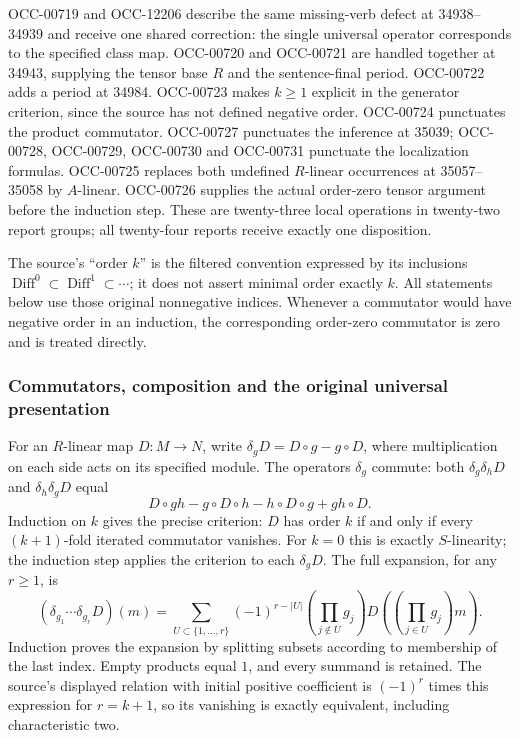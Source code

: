 OCC-00719 and OCC-12206 describe the same missing-verb defect at 34938--34939 and receive one shared correction: the single universal operator corresponds to the specified class map. OCC-00720 and OCC-00721 are handled together at 34943, supplying the tensor base \(R\) and the sentence-final period. OCC-00722 adds a period at 34984. OCC-00723 makes \(k\ge1\) explicit in the generator criterion, since the source has not defined negative order. OCC-00724 punctuates the product commutator. OCC-00727 punctuates the inference at 35039; OCC-00728, OCC-00729, OCC-00730 and OCC-00731 punctuate the localization formulas. OCC-00725 replaces both undefined \(R\)-linear occurrences at 35057--35058 by \(A\)-linear. OCC-00726 supplies the actual order-zero tensor argument before the induction step. These are twenty-three local operations in twenty-two report groups; all twenty-four reports receive exactly one disposition.

The source's ``order \(k\)'' is the filtered convention expressed by its inclusions \(\operatorname{Diff}^0\subset\operatorname{Diff}^1\subset\cdots\); it does not assert minimal order exactly \(k\). All statements below use those original nonnegative indices. Whenever a commutator would have negative order in an induction, the corresponding order-zero commutator is zero and is treated directly.

\subsubsection{Commutators, composition and the original universal presentation}\label{commutators-composition-and-the-original-universal-presentation}

For an \(R\)-linear map \(D:M\to N\), write \(\delta_gD=D\circ g-g\circ D\), where multiplication on each side acts on its specified module. The operators \(\delta_g\) commute: both \(\delta_g\delta_hD\) and \(\delta_h\delta_gD\) equal \[
D\circ gh-g\circ D\circ h-h\circ D\circ g+gh\circ D.
\] Induction on \(k\) gives the precise criterion: \(D\) has order \(k\) if and only if every \((k+1)\)-fold iterated commutator vanishes. For \(k=0\) this is exactly \(S\)-linearity; the induction step applies the criterion to each \(\delta_gD\). The full expansion, for any \(r\ge1\), is \[
(\delta_{g_1}\cdots\delta_{g_r}D)(m)
=\sum_{U\subset\{1,\ldots,r\}}(-1)^{r-|U|}
\left(\prod_{j\notin U}g_j\right)
D\left(\left(\prod_{j\in U}g_j\right)m\right).
\] Induction proves the expansion by splitting subsets according to membership of the last index. Empty products equal \(1\), and every summand is retained. The source's displayed relation with initial positive coefficient is \((-1)^r\) times this expression for \(r=k+1\), so its vanishing is exactly equivalent, including characteristic two.


